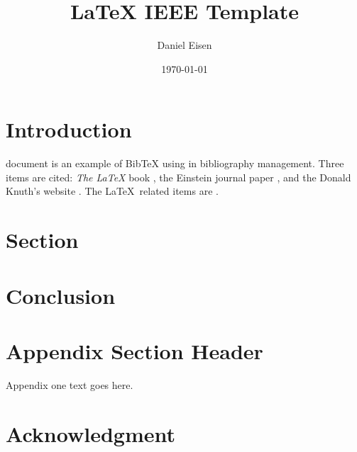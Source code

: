 \documentclass[journal]{IEEEtran}
\title{{\LaTeX} IEEE Template}
\author{Daniel Eisen}
\date{\today}
\begin{document}
\maketitle
\begin{abstract}
\end{abstract}

\begin{IEEEkeywords}
\end{IEEEkeywords}

\section{Introduction}
   document is an example of BibTeX using in bibliography management. 
  Three items are cited: \textit{The \LaTeX\Companion} book \cite{latexcompanion}, the Einstein journal paper \cite{einstein}, 
  and the Donald Knuth's website \cite{knuthwebsite}. The \LaTeX\ related items are \cite{latexcompanion, einstein, knuthwebsite}. 

\section{Section}

\section{Conclusion}

\appendices
    \section{Appendix Section Header}
        Appendix one text goes here.

    \section{}

\section*{Acknowledgment}

\newpage


\end{document}
